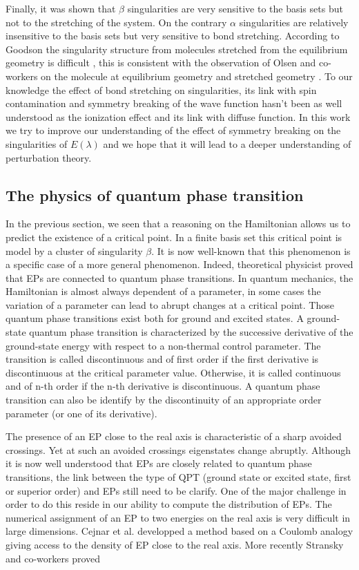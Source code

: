 \documentclass[11pt,a4paper]{article}
\begin{document}
{Finally, it was shown that $\beta$ singularities are very sensitive to the basis sets but not to the stretching of the system. On the contrary $\alpha$ singularities are relatively insensitive to the basis sets but very sensitive to bond stretching. According to Goodson the singularity structure from molecules stretched from the equilibrium geometry is difficult \cite{Goodson_2004}, this is consistent with the observation of Olsen and co-workers on the  molecule at equilibrium geometry and stretched geometry \cite{Olsen_2000}. To our knowledge the effect of bond stretching on singularities, its link with spin contamination and symmetry breaking of the wave function hasn't been as well understood as the ionization effect and its link with diffuse function. In this work we try to improve our understanding of the effect of symmetry breaking on the singularities of $E(\lambda)$ and we hope that it will lead to a deeper understanding of perturbation theory.

\subsection{The physics of quantum phase transition}

In the previous section, we seen that a reasoning on the Hamiltonian allows us to predict the existence of a critical point. In a finite basis set this critical point is model by a cluster of singularity $\beta$. It is now well-known that this phenomenon is a specific case of a more general phenomenon. Indeed, theoretical physicist proved that EPs are connected to quantum phase transitions. In quantum mechanics, the Hamiltonian is almost always dependent of a parameter, in some cases the variation of a parameter can lead to abrupt changes at a critical point. Those quantum phase transitions exist both for ground and excited states. A ground-state quantum phase transition is characterized by the successive derivative of the ground-state energy with respect to a non-thermal control parameter. The transition is called discontinuous and of first order if the first derivative is discontinuous at the critical parameter value. Otherwise, it is called continuous and of n-th order if the n-th derivative is discontinuous. A quantum phase transition can also be identify by the discontinuity of an appropriate order parameter (or one of its derivative). 

The presence of an EP close to the real axis is characteristic of a sharp avoided crossings. Yet at such an avoided crossings eigenstates change abruptly. Although it is now well understood that EPs are closely related to quantum phase transitions, the link between the type of QPT (ground state or excited state, first or superior order) and EPs still need to be clarify. One of the major challenge in order to do this reside in our ability to compute the distribution of EPs. The numerical assignment of an EP to two energies on the real axis is very difficult in large dimensions. Cejnar et al. developped a method based on a Coulomb analogy giving access to the density of EP close to the real axis. More recently Stransky and co-workers proved

}
\end{document}
